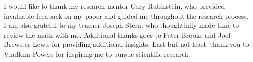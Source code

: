 I would like to thank my research mentor Gary Rubinstein, who provided invaluable feedback on my paper and guided me throughout the research process. I am also grateful to my teacher Joseph Stern, who thoughtfully made time to review the math with me. Additional thanks goes to Peter Brooks and Joel Brewster Lewis for providing additional insights. Last but not least, thank you to Vladlena Powers for inspiring me to pursue scientific research.
